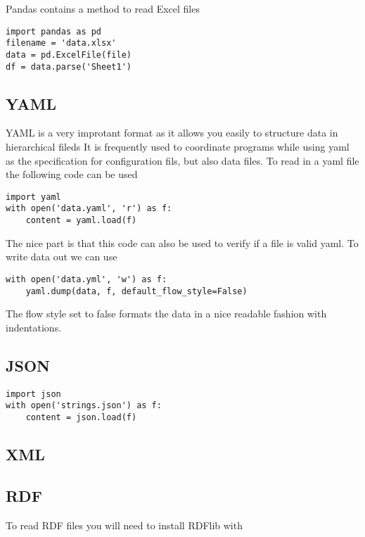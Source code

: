 Pandas contains a method to read Excel files

\begin{verbatim}
import pandas as pd
filename = 'data.xlsx'
data = pd.ExcelFile(file)
df = data.parse('Sheet1')
\end{verbatim}

\subsection{YAML}

YAML is a very improtant format as it allows you easily to structure
data in hierarchical fileds It is frequently used to coordinate
programs while using yaml as the specification for configuration fils,
but also data files. To read in a yaml file the following code can be
used

\begin{verbatim}
import yaml
with open('data.yaml', 'r') as f:
    content = yaml.load(f)
\end{verbatim}

The nice part is that this code can also be used to verify if a file
is valid yaml. To write data out we can use

\begin{verbatim}
with open('data.yml', 'w') as f:
    yaml.dump(data, f, default_flow_style=False)
\end{verbatim}

The flow style set to false formats the data in a nice readable
fashion with indentations.


\subsection{JSON}

\begin{verbatim}
import json
with open('strings.json') as f:
    content = json.load(f)
\end{verbatim}

\subsection{XML}


\subsection{RDF}

To read RDF files you will need to install RDFlib with 

